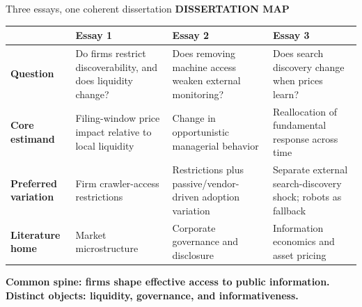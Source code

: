 \documentclass[aspectratio=169,10pt]{beamer}
\newcommand{\eyebrow}[1]{%
  {\color{accent}\fontsize{7.3}{9}\selectfont\bfseries\MakeUppercase{#1}}\par\vspace{0.10cm}%
}
\newcommand{\smalltext}{\fontsize{8.1}{10.2}\selectfont}
\begin{document}
\begin{frame}[t]{Three essays, one coherent dissertation}
\eyebrow{Dissertation map}

\vspace{0.12cm}
{\smalltext
\renewcommand{\arraystretch}{1.38}
\setlength{\tabcolsep}{0.09cm}
\begin{tabularx}{\textwidth}{>{\bfseries\RaggedRight\arraybackslash}p{2.15cm} >{\RaggedRight\arraybackslash}X >{\RaggedRight\arraybackslash}X >{\RaggedRight\arraybackslash}X}
\toprule
 & \textbf{Essay 1} & \textbf{Essay 2} & \textbf{Essay 3} \\
\midrule
Question & Do firms restrict discoverability, and does liquidity change? & Does removing machine access weaken external monitoring? & Does search discovery change when prices learn? \\
Core estimand & Filing-window price impact relative to local liquidity & Change in opportunistic managerial behavior & Reallocation of fundamental response across time \\
Preferred variation & Firm crawler-access restrictions & Restrictions plus passive/vendor-driven adoption variation & Separate external search-discovery shock; robots as fallback \\
Literature home & Market microstructure & Corporate governance and disclosure & Information economics and asset pricing \\
\bottomrule
\end{tabularx}}

\vspace{0.18cm}
{\smalltext\bfseries\color{accent}Common spine: firms shape effective access to public information. Distinct objects: liquidity, governance, and informativeness.}
\end{frame}
\end{document}
